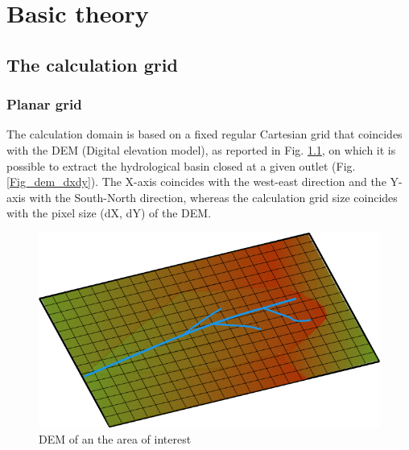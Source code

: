 \chapter{Basic theory}

\section{The calculation grid}\label{Par:calc_grid}

\subsection{Planar grid}
The calculation domain is based on a fixed regular Cartesian grid that coincides with the DEM (Digital elevation model), as reported in Fig. \ref{Fig_gen_dem}, on which it is possible to extract the hydrological basin closed at a given outlet  (Fig. \ref{Fig_dem_dxdy}). The X-axis coincides with the west-east direction and the Y-axis with the South-North direction, whereas the calculation grid size coincides with the pixel size (dX, dY) of the DEM. 


\begin{figure}[!h]
\begin{center}
\begin{minipage}[c]{1.0 \textwidth}
\centering
\includegraphics[width =0.72 \textwidth]{./images/pic_domain/dem_river}
\end{minipage}%
\end{center}
\caption{DEM of an the area of interest}
\label{Fig_gen_dem}
\end{figure}



